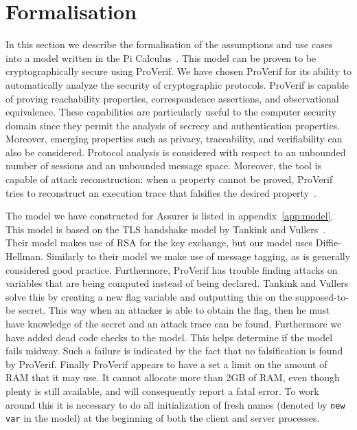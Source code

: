 \section{Formalisation}
\label{sec:formalisation}
In this section we describe the formalisation of the assumptions and use cases into a model written in the Pi Calculus~\cite{picalculus}. This model can be proven to be cryptographically secure using ProVerif. We have chosen ProVerif for its ability to automatically analyze the security of cryptographic protocols. ProVerif is capable of proving reachability properties, correspondence assertions, and observational equivalence. These capabilities are particularly useful to the computer security domain since they permit the analysis of secrecy and authentication properties. Moreover, emerging properties such as privacy, traceability, and verifiability can also be considered. Protocol analysis is considered with respect to an unbounded number of sessions and an unbounded message space. Moreover, the tool is capable of attack reconstruction: when a property cannot be proved, ProVerif tries to reconstruct an execution trace that falsifies the desired property~\cite{proverifmanual}.

The model we have constructed for Assurer is listed in appendix~\ref{app:model}. This model is based on the TLS handshake model by Tankink and Vullers~\cite{tankink2008verification}. Their model makes use of RSA for the key exchange, but our model uses Diffie-Hellman. Similarly to their model we make use of message tagging, as is generally considered good practice. Furthermore, ProVerif has trouble finding attacks on variables that are being computed instead of being declared. Tankink and Vullers solve this by creating a new flag variable and outputting this on the supposed-to-be secret. This way when an attacker is able to obtain the flag, then he must have knowledge of the secret and an attack trace can be found. Furthermore we have added dead code checks to the model. This helps determine if the model fails midway. Such a failure is indicated by the fact that no falsification is found by ProVerif. Finally ProVerif appears to have a set a limit on the amount of RAM that it may use. It cannot allocate more than 2GB of RAM, even though plenty is still available, and will consequently report a fatal error. To work around this it is necessary to do all initialization of fresh names (denoted by \texttt{new var} in the model) at the beginning of both the client and server processes.

